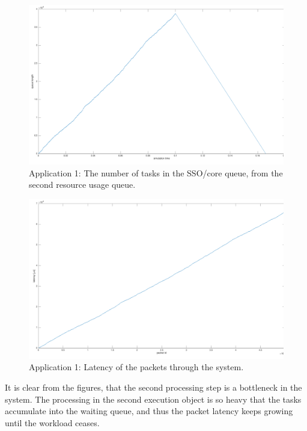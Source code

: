 \begin{figure}[]
  \begin{center}
    \includegraphics[width=\textwidth]{images/app1-queue2.pdf}
    \caption{Application 1: The number of tasks in the SSO/core queue, from the second resource usage queue.}
    \label{fig:app1-queue2}
  \end{center}
\end{figure}

\begin{figure}[]
  \begin{center}
    \includegraphics[width=\textwidth]{images/app1-latency.pdf}
    \caption{Application 1: Latency of the packets through the system.}
    \label{fig:app1-latency}
  \end{center}
\end{figure}

It is clear from the figures, that the second processing step is a bottleneck in the system. The processing in the second execution object is so heavy that the tasks accumulate into the waiting queue, and thus the packet latency keeps growing until the workload ceases.


